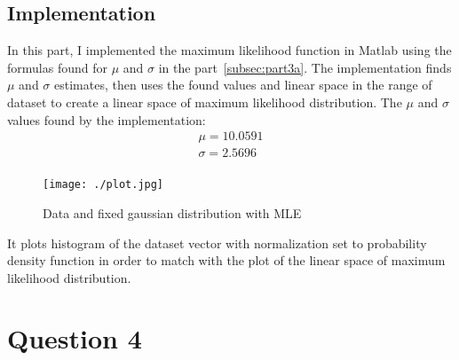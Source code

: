 \documentclass{article}
\begin{document}
\subsection{Implementation}
In this part, I implemented the maximum likelihood function in Matlab using the formulas found for $\mu$ and $\sigma$ in the part~\ref{subsec:part3a}. 
\newline\newline
The implementation finds $\mu$ and $\sigma$ estimates, then uses the found values and linear space in the range of dataset to create a linear space of maximum likelihood distribution. The $\mu$ and $\sigma$ values found by the implementation:
\begin{equation*}
	\begin{aligned}
	\mu =  10.0591 \\
	\sigma =  2.5696 \\
	\end{aligned}
\end{equation*}

\begin{figure} [h]
 \centering
  \texttt{[image: ./plot.jpg]}
  \caption{Data and fixed gaussian distribution with MLE}
\end{figure}

It plots histogram of the dataset vector with normalization set to probability density function in order to match with the plot of the linear space of maximum likelihood distribution. 
\newline\newline\newline\newline
\section{Question 4}
\end{document}
